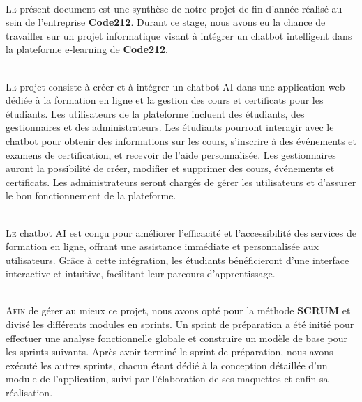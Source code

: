 \documentclass[a4paper, 11pt, openany]{report}
\begin{document}
\ \\







\Newpage


\lettrine[nindent=0em, slope=-.5em]{\color{Eblue}L}{e} présent document est une synthèse de notre projet de fin d’année réalisé au sein de l'entreprise \textbf{Code212}. Durant ce stage, nous avons eu la chance de travailler sur un projet informatique visant à intégrer un chatbot intelligent dans la plateforme e-learning de \textbf{Code212}.

\ \\

\lettrine[nindent=0em, slope=-.5em]{\color{Eblue}L}{e} projet consiste à créer et à intégrer un chatbot AI dans une application web dédiée à la formation en ligne et la gestion des cours et certificats pour les étudiants. Les utilisateurs de la plateforme incluent des étudiants, des gestionnaires et des administrateurs. Les étudiants pourront interagir avec le chatbot pour obtenir des informations sur les cours, s'inscrire à des événements et examens de certification, et recevoir de l'aide personnalisée. Les gestionnaires auront la possibilité de créer, modifier et supprimer des cours, événements et certificats. Les administrateurs seront chargés de gérer les utilisateurs et d'assurer le bon fonctionnement de la plateforme.

\ \\

\lettrine[nindent=0em, slope=-.5em]{\color{Eblue}L}{e} chatbot AI est conçu pour améliorer l'efficacité et l'accessibilité des services de formation en ligne, offrant une assistance immédiate et personnalisée aux utilisateurs. Grâce à cette intégration, les étudiants bénéficieront d'une interface interactive et intuitive, facilitant leur parcours d'apprentissage.

\ \\

\lettrine[nindent=0em, slope=-.5em]{\color{Eblue}A}{fin} de gérer au mieux ce projet, nous avons opté pour la méthode \textbf{SCRUM} et divisé les différents modules en sprints. Un sprint de préparation a été initié pour effectuer une analyse fonctionnelle globale et construire un modèle de base pour les sprints suivants. Après avoir terminé le sprint de préparation, nous avons exécuté les autres sprints, chacun étant dédié à la conception détaillée d’un module de l’application, suivi par l'élaboration de ses maquettes et enfin sa réalisation.
\end{document}

